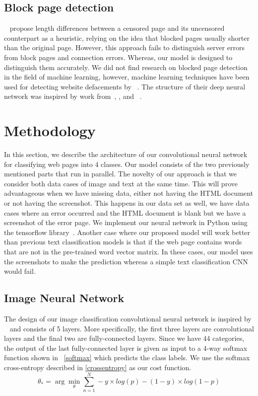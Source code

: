 \documentclass{article} %
\newcommand{\argmin}{\arg\!\min}
\begin{document}
\subsection{Block page detection}
~\parencite{imc14_phillipa} propose length differences between a censored page and its uncensored counterpart as a heuristic, 
relying on the idea that blocked pages usually shorter than the original page. However, this approach fails to distinguish server errors from block pages and connection errors. Whereas, our model is designed to distinguish them accurately.
We did not find research on blocked page detection in the field of machine learning, however, machine learning techniques have been used for detecting website defacements by ~\parencite{meerkat}. The structure of their deep neural network was inspired by work from~\parencite{imagehinton}, \parencite{nipsandrewng}, and ~\parencite{icml_unsupervised}.

\section{Methodology}
In this section, we describe the architecture of our convolutional neural network for classifying web pages into 4 classes. Our model consists of the two previously mentioned parts that run in parallel. The novelty of our approach is that we consider both data cases of image and text at the same time. This will prove advantageous when we have missing data, either not having the HTML document or not having the screenshot. This happens in our data set as well, we have data cases where an error occurred and the HTML document is blank but we have a screenshot of the error page. We implement our neural network in Python using the tensorflow library~\cite{tensorflow2015}. Another case where our proposed model will work better than previous text classification models is that if the web page contains words that are not in the pre-trained word vector matrix. In these cases, our model uses the screenshots to make the prediction whereas a simple text classification CNN would fail.

\subsection{Image Neural Network}
The design of our image classification convolutional neural network is inspired by ~\cite{imagehinton} and consists of 5 layers. More specifically, the first three layers are convolutional layers and the final two are fully-connected layers. Since we have 44 categories, the output of the last fully-connected layer is given as input to a 4-way softmax function shown in ~\ref{softmax} which predicts the class labels. We use the softmax cross-entropy described in \ref{crossentropy} as our cost function.
\begin{equation} \label{crossentropy}
\theta_{*} = \argmin_\theta \sum_{n=1} ^{N} -y \times log(p)-(1-y)\times log(1-p)
\end{equation}
\end{document}
